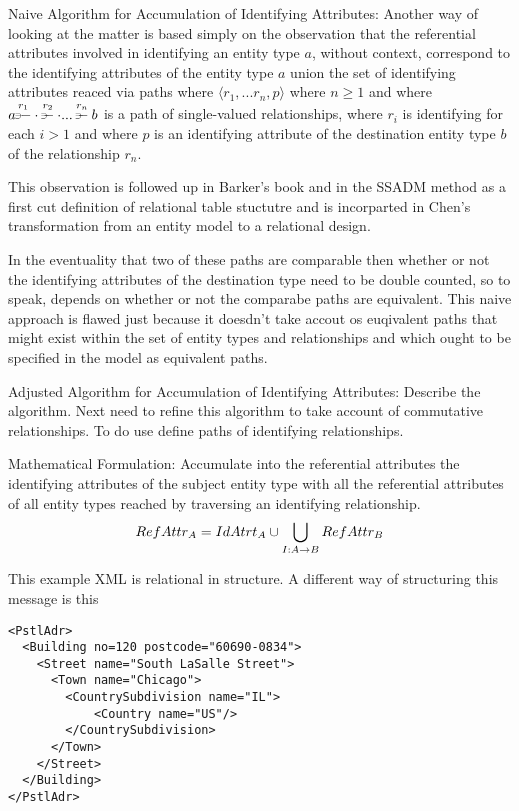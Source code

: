 \mynote 
Naive Algorithm for Accumulation of Identifying Attributes:
 Another way of looking at the matter is based simply on the observation that the referential attributes involved in identifying an entity  type $a$, without
 context,  correspond to the identifying attributes of the entity type $a$ union the set of identifying attributes reaced 
 via paths 
 where  $\langle r_1,...r_n, p \rangle$ where $n \geq 1$ and where
$\overset{r_1}{a \rightpitchfork \hspace{-0.35em} -  \cdot} \overset{r_2}{\rightpitchfork \hspace{-0.35em} -} \cdot ... \overset{r_n}{\rightpitchfork \hspace{-0.35em} -} b$ is a path of single-valued relationships, where 
$r_i$ is identifying for each $i > 1$ and where $p$ is an identifying attribute of the destination entity type $b$ of the
relationship $r_n$. 

This observation is followed up in Barker's book and in the SSADM method as a first cut definition of relational table stuctutre and is incorparted in Chen's transformation from an entity model to a relational design.

In the eventuality that two of these paths are comparable then whether or not the identifying attributes of the destination type need to be double counted, so to speak,
depends on whether or not the comparabe paths are equivalent.
\mynote
This naive approach is flawed just because it doesdn't take accout os euqivalent paths that might exist within the set of entity types and relationships and which ought to be specified in the model as equivalent paths.

\mynote 
Adjusted Algorithm for Accumulation of Identifying Attributes:
Describe the algorithm.
Next need to refine this algorithm to take account of commutative relationships. 
To do use define paths of identifying relationships.

\mynote
Mathematical Formulation:
Accumulate into the referential attributes the identifying attributes of the subject entity type
with all the referential attributes of all entity types reached by traversing an identifying relationship.
$$RefAttr_A=IdAtrt_A \cup \bigcup_{I:A \rightarrow B}RefAttr_B$$

\mynote
This example XML is relational in structure. A different way of structuring this message
is this
\begin{verbatim}
<PstlAdr>
  <Building no=120 postcode="60690-0834">
    <Street name="South LaSalle Street">
      <Town name="Chicago">
        <CountrySubdivision name="IL">
            <Country name="US"/>
        </CountrySubdivision>
      </Town>
    </Street>
  </Building>
</PstlAdr>
\end{verbatim}

